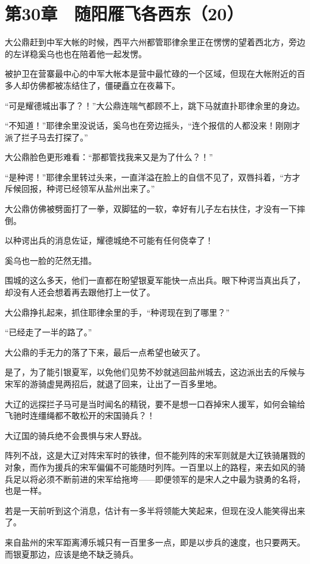 \section{第30章　随阳雁飞各西东（20）}

大公鼎赶到中军大帐的时候，西平六州都管耶律余里正在愣愣的望着西北方，旁边的左详稳奚乌也也在陪着他一起发愣。

被护卫在营寨最中心的中军大帐本是营中最忙碌的一个区域，但现在大帐附近的百多人却仿佛都被冻结住了，僵硬矗立在夜幕下。

“可是耀德城出事了？！”大公鼎连喘气都顾不上，跳下马就直扑耶律余里的身边。

“不知道！”耶律余里没说话，奚乌也在旁边摇头，“连个报信的人都没来！刚刚才派了拦子马去打探了。”

大公鼎脸色更形难看：“那都管找我来又是为了什么？！”

“是种谔！”耶律余里转过头来，一直洋溢在脸上的自信不见了，双唇抖着，“方才斥候回报，种谔已经领军从盐州出来了。”

大公鼎仿佛被劈面打了一拳，双脚猛的一软，幸好有儿子左右扶住，才没有一下摔倒。

以种谔出兵的消息佐证，耀德城绝不可能有任何侥幸了！

奚乌也一脸的茫然无措。

围城的这么多天，他们一直都在盼望银夏军能快一点出兵。眼下种谔当真出兵了，却没有人还会想着再去跟他打上一仗了。

大公鼎挣扎起来，抓住耶律余里的手，“种谔现在到了哪里？”

“已经走了一半的路了。”

大公鼎的手无力的落了下来，最后一点希望也破灭了。

是了，为了能引银夏军，以免他们见势不妙就逃回盐州城去，这边派出去的斥候与宋军的游骑虚晃两招后，就退了回来，让出了一百多里地。

大辽的远探拦子马可是当时闻名的精锐，要不是想一口吞掉宋人援军，如何会输给飞驰时连缰绳都不敢松开的宋国骑兵？！

大辽国的骑兵绝不会畏惧与宋人野战。

阵列不战，这是大辽对阵宋军时的铁律，但不能列阵的宋军则就是大辽铁骑屠戮的对象，而作为援兵的宋军偏偏不可能随时列阵。一百里以上的路程，来去如风的骑兵足以将必须不断前进的宋军给拖垮——即便领军的是宋人之中最为骁勇的名将，也是一样。

若是一天前听到这个消息，估计有一多半将领能大笑起来，但现在没人能笑得出来了。

来自盐州的宋军距离溥乐城只有一百里多一点，即是以步兵的速度，也只要两天。而银夏那边，应该是绝不缺乏骑兵。

